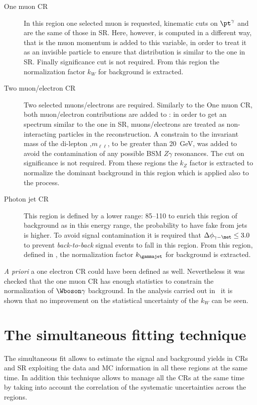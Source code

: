 \begin{description}
\item [One muon CR] In this region one selected muon is requested, kinematic cuts on $\pt^\gamma$ and \met are the same of those in SR. Here, however, \met is computed in a different way, that is the muon momentum is added to this variable, in order to treat it as an invisible particle to ensure that \met distribution is similar to the one in SR. Finally \met significance cut is not required. From this region the normalization factor $k_W$ for \wg background is extracted.
\item [Two muon/electron CR] Two selected muons/electrons are required. Similarly to the One muon CR, both muon/electron contributions are added to \met: in order to get an \met spectrum similar to the one in SR, muons/electrons are treated as non-interacting particles in the \met reconstruction.  A constrain to the invariant mass of the di-lepton ,$m_{\ell\ell}$, to be greater than \SI{20}{\GeV}, was added to avoid the contamination of any possible BSM $Z\gamma$ resonances. The cut on \met significance is not required. From these regions the $k_Z$ factor is extracted to normalize the dominant background \zg in this region which is applied also to the \znng process.
\item [Photon jet CR] This region is defined by a lower \met range: \SIrange{85}{110}{\gev} to enrich this region of \gj background as in this energy range, the probability to have fake \met from jets is higher. To avoid signal contamination it is required that $\Delta\phi_{\gamma - \met} \le 3.0$ to prevent {\itshape back-to-back} signal events to fall in this region. From this region, defined in \RunTwo, the normalization factor $k_{\gammajet}$ for \gj background is extracted.
\end{description}

{\itshape A priori} a one electron CR could have been defined as well. Nevertheless it was checked that the one muon CR has enough statistics to constrain the normalization of $\Wboson\gamma$ background. In the \mph analysis carried out in~\cite{paperMP} it is shown that no improvement on the statistical uncertainty of the $k_W$ can be seen.

\pagebreak
\section{The simultaneous fitting technique }
\label{sec:simfit}
The simultaneous fit allows to estimate the signal and background yields in CRs and SR exploiting the data and MC information in all these regions at the same time. In addition this technique allows to manage all the CRs at the same time by taking into account the correlation of the systematic uncertainties across the regions.

